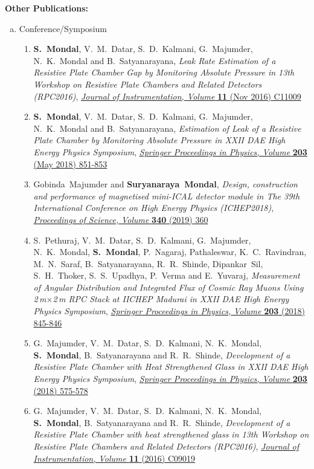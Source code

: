 \documentclass[a4paper,12pt,twoside,openany]{article}
\begin{document}
\noindent\textbf{Other Publications:}
\begin{enumerate}[a.]
\item Conference/Symposium
  \begin{enumerate}[1)]
  \item \textbf{S.~Mondal}, V.~M.~Datar, S.~D.~Kalmani, G.~Majumder, N.~K.~Mondal and B.~Satyanarayana, \emph{Leak Rate Estimation of a Resistive Plate Chamber Gap by Monitoring Absolute Pressure in 13th Workshop on Resistive Plate Chambers and Related Detectors (RPC2016)}, \href{https://doi.org/10.1088/1748-0221/11/11/C11009}{\emph{Journal of Instrumentation, Volume } \textbf{11} (Nov 2016) C11009}
  \item \textbf{S.~Mondal}, V.~M.~Datar, S.~D.~Kalmani, G.~Majumder, N.~K.~Mondal and B.~Satyanarayana, \emph{Estimation of Leak of a Resistive Plate Chamber by Monitoring Absolute Pressure in XXII DAE High Energy Physics Symposium}, \href{https://doi.org/10.1007/978-3-319-73171-1_207}{\emph{Springer Proceedings in Physics, Volume } \textbf{203} (May 2018) 851-853}
  \item Gobinda~Majumder and \textbf{Suryanaraya~Mondal}, \emph{Design, construction and performance of magnetised mini-ICAL detector module in The 39th International Conference on High Energy Physics (ICHEP2018)}, \href{https://doi.org/10.22323/1.340.0360}{\emph{Proceedings of Science,} \textit{Volume} \textbf{340} (2019) 360}
  \item S.~Pethuraj, V.~M.~Datar, S.~D.~Kalmani, G.~Majumder, N.~K.~Mondal, \textbf{S.~Mondal}, P.~Nagaraj, Pathaleswar, K.~C.~Ravindran, M.~N.~Saraf, B.~Satyanarayana, R.~R.~Shinde, Dipankar~Sil, S.~H.~Thoker, S.~S.~Upadhya, P.~Verma and E.~Yuvaraj, \emph{Measurement of Angular Distribution and Integrated Flux of Cosmic Ray Muons Using 2\,m$\times$2\,m RPC Stack at IICHEP Madurai in XXII DAE High Energy Physics Symposium}, \href{https://doi.org/10.1007/978-3-319-73171-1_205}{\emph{Springer Proceedings in Physics,} \emph{Volume} \textbf{203} (2018) 845-846}
  \item G.~Majumder, V.~M.~Datar, S.~D.~Kalmani, N.~K.~Mondal, \textbf{S.~Mondal}, B.~Satyanarayana and R.~R.~Shinde, \emph{Development of a Resistive Plate Chamber with Heat Strengthened Glass in XXII DAE High Energy Physics Symposium}, \href{https://doi.org/10.1007/978-3-319-73171-1_135}{\emph{Springer Proceedings in Physics, Volume} \textbf{203} (2018) 575-578}
  \item  G.~Majumder, V.~M.~Datar, S.~D.~Kalmani, N.~K.~Mondal, \textbf{S.~Mondal}, B.~Satyanarayana and R.~R.~Shinde, \emph{Development of a Resistive Plate Chamber with heat strengthened glass in 13th Workshop on Resistive Plate Chambers and Related Detectors (RPC2016)}, \href{https://doi.org/10.1088/1748-0221/11/09/C09019}{\emph{Journal of Instrumentation, Volume} \textbf{11} (2016) C09019}

\end{enumerate}
\end{enumerate}
\end{document}
